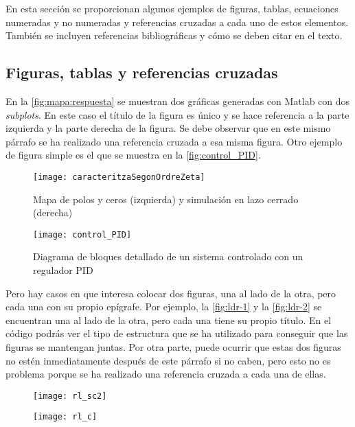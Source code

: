 \documentclass[11pt]{article}
\begin{document}
En esta sección se proporcionan algunos ejemplos de figuras, tablas, ecuaciones numeradas y no numeradas y referencias cruzadas a cada uno de estos elementos. También se incluyen referencias bibliográficas y cómo se deben citar en el texto.

\subsection{Figuras, tablas y referencias cruzadas}

En la \autoref{fig:mapa:respuesta} se muestran dos gráficas generadas con Matlab con dos \textit{subplots}. En este caso el título de la figura es único y se hace referencia a la parte izquierda y la parte derecha de la figura. Se debe observar que en este mismo párrafo se ha realizado una referencia cruzada a esa misma figura. Otro ejemplo de figura simple es el que se muestra en la \autoref{fig:control_PID}.

\begin{figure}[H]
    \bigskip %
	\centering
  	\texttt{[image: caracteritzaSegonOrdreZeta]} %
  	\caption{Mapa de polos y ceros (izquierda) y simulación en lazo cerrado (derecha)}
  	\label{fig:mapa:respuesta}
  	\medskip
\end{figure}

\begin{figure}[H]
	\centering
  	\texttt{[image: control\_PID]} %
  	\captionsetup{width=0.625\textwidth} %
  	\caption{Diagrama de bloques detallado de un sistema controlado con un regulador PID}
  	\label{fig:control_PID}
\end{figure}

Pero hay casos en que interesa colocar dos figuras, una al lado de la otra, pero cada una con su propio epígrafe. Por ejemplo, la \autoref{fig:ldr-1} y la \autoref{fig:ldr-2} se encuentran una al lado de la otra, pero cada una tiene su propio título. En el código podrás ver el tipo de estructura que se ha utilizado para conseguir que las figuras se mantengan juntas. Por otra parte, puede ocurrir que estas dos figuras no estén inmediatamente después de este párrafo si no caben, pero esto no es problema porque se ha realizado una referencia cruzada a cada una de ellas.

\begin{figure}[ht]
    \centering
    \parbox[t]{0.475\textwidth}{\centering
    	\texttt{[image: rl\_sc2]}
    	\label{fig:ldr-1}
    }
    \hfill
    \parbox[t]{0.475\textwidth}{\centering
    	\texttt{[image: rl\_c]}
    	\label{fig:ldr-2}
    }
\end{figure}
\end{document}
